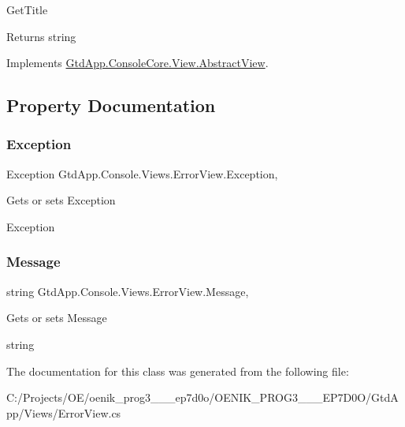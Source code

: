 Get\+Title 

\begin{DoxyReturn}{Returns}
string
\end{DoxyReturn}


Implements \mbox{\hyperlink{class_gtd_app_1_1_console_core_1_1_view_1_1_abstract_view_ada76ebf03434f22dbd103a09f292ff7c}{Gtd\+App.\+Console\+Core.\+View.\+Abstract\+View}}.



\subsection{Property Documentation}
\mbox{\label{class_gtd_app_1_1_console_1_1_views_1_1_error_view_a03723522a97eac75194a662104524f2b}} 
\subsubsection{\texorpdfstring{Exception}{Exception}}
{\footnotesize\ttfamily Exception Gtd\+App.\+Console.\+Views.\+Error\+View.\+Exception\hspace{0.3cm}{\ttfamily [get]}, {\ttfamily [set]}}



Gets or sets Exception 

Exception\mbox{\label{class_gtd_app_1_1_console_1_1_views_1_1_error_view_a85e262bc70f0bdc8d0145ee015b72aef}} 
\subsubsection{\texorpdfstring{Message}{Message}}
{\footnotesize\ttfamily string Gtd\+App.\+Console.\+Views.\+Error\+View.\+Message\hspace{0.3cm}{\ttfamily [get]}, {\ttfamily [set]}}



Gets or sets Message 

string

The documentation for this class was generated from the following file\+:\begin{DoxyCompactItemize}
\item 
C\+:/\+Projects/\+O\+E/oenik\+\_\+prog3\+\_\+\_\+\_\+ep7d0o/\+O\+E\+N\+I\+K\+\_\+\+P\+R\+O\+G3\+\_\+\_\+\_\+\+E\+P7\+D0\+O/\+Gtd\+App/\+Views/Error\+View.\+cs\end{DoxyCompactItemize}
